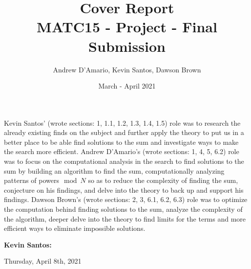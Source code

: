 \documentclass{article}
\title{Cover Report \\ \vspace{.3in} \large{MATC15 - Project - Final Submission}}
\author{Andrew D'Amario, Kevin Santos, Dawson Brown}
\date{March - April 2021}
\begin{document}
\maketitle

\begin{flushleft}



Kevin Santos' (wrote sections: 1, 1.1, 1.2, 1.3, 1.4, 1.5) role was to research the already existing finds on the subject and further apply the theory to put us in a better place to be able find solutions to the sum and investigate ways to make the search more efficient.
Andrew D'Amario's (wrote sections: 1, 4, 5, 6.2) role was to focus on the computational analysis in the search to find solutions to the sum by building an algorithm to find the sum, computationally analyzing patterns of powers$\mod N$ so as to reduce the complexity of finding the sum, conjecture on his findings, and delve into the theory to back up and support his findings.
Dawson Brown's (wrote sections: 2, 3, 6.1, 6.2, 6.3) role was to optimize the computation behind finding solutions to the sum, analyze the complexity of the algorithm, deeper delve into the theory to find limits for the terms and more efficient ways to eliminate impossible solutions.

\vspace{.5in}

{\bf Kevin Santos:}
\hspace{.63in}{\bf Dawson Brown:}
\hspace{.63in}{\bf Andrew D'Amario: }  


\vspace{1in}


Thursday, April 8th, 2021

\end{flushleft}
\end{document}
